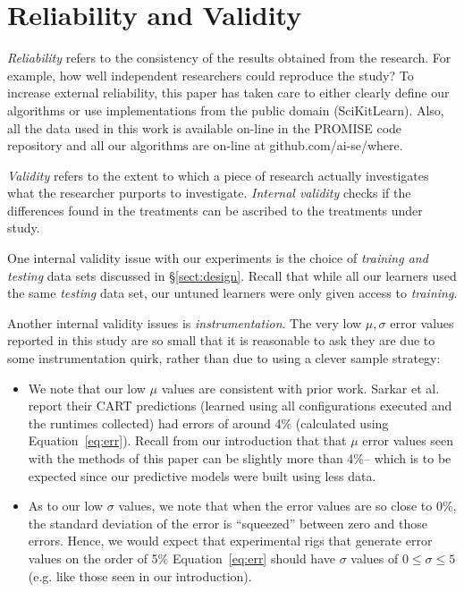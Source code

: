 \documentclass{sig-alternative}
\newcommand{\bi}{\begin{itemize}}%
\newcommand{\ei}{\end{itemize}}
\newcommand{\tion}[1]{\S\ref{sect:#1}}
\newcommand{\eq}[1]{Equation~\ref{eq:#1}}
\begin{document}
\section{Reliability and Validity}\label{sect:construct}

{\em Reliability} refers to the consistency of the results obtained
from the research.  For example,   how well independent researchers
could reproduce the study? To increase external
reliability, this paper has taken care to either  clearly define our
algorithms or use implementations from the public domain
(SciKitLearn). Also, all the data used in this work is available
on-line in the PROMISE code repository and all our algorithms
are on-line at github.com/ai-se/where.

{\em Validity} refers to the extent to which a piece of research actually
investigates what the researcher purports to investigate.
{\em Internal validity} checks if the differences found in
the treatments can be ascribed to the treatments under study. 

One internal validity issue with our experiments is the choice
of {\em training and testing} data sets discussed in 
\tion{design}. Recall that while all our learners used the same
{\em testing} data set, our untuned learners were only given
access to {\em training}.

Another internal validity issues is {\em instrumentation}. The very low $\mu,\sigma$ error values
reported in this study are so small that it is reasonable to ask they are due to some instrumentation
quirk, rather than due to using a clever sample strategy:
\bi
\item
We note that our low $\mu$ values are consistent with prior work.  Sarkar et al.~\cite{sarkar2015cost} report their CART predictions
(learned using all configurations executed and the runtimes collected) had  errors of around 4\% (calculated using \eq{err}). Recall from our introduction that that  $\mu$ error values  seen with the methods of this paper
can be slightly more than 4\%-- which is to be expected since our predictive models were built using less
data. 
\item
As to our low $\sigma$ values, we note that when the  error values are so close to 0\%, the standard
deviation of the error is ``squeezed'' between zero and those errors. Hence, we would expect that
experimental rigs
that generate error values on the order of 5\% \eq{err} should have $\sigma$ values of $0\le \sigma \le 5$ (e.g. like those seen in our introduction).
\ei
\end{document}
